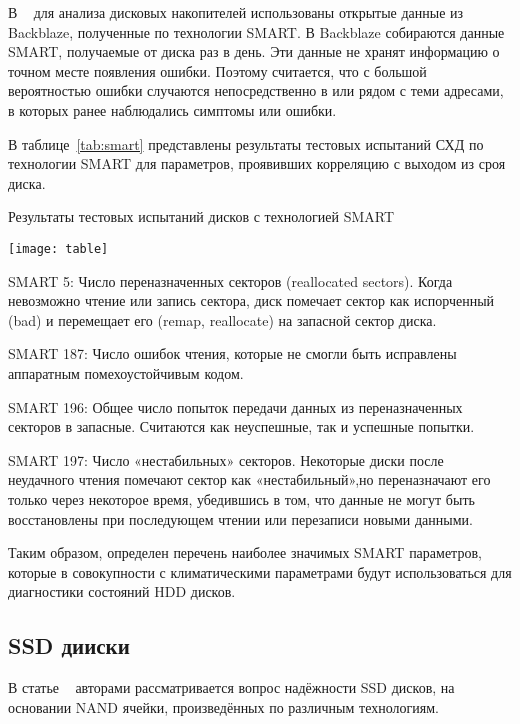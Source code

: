 В ~\cite{diskred} для анализа дисковых накопителей использованы открытые данные из Backblaze,  полученные  по  технологии SMART.  В Backblaze собираются  данные SMART,  получаемые  от диска  раз  в день.  Эти данные не хранят информацию о точном месте появления ошибки. Поэтому считается, что с большой вероятностью ошибки случаются непосредственно в или рядом с теми адресами, в которых ранее наблюдались симптомы или ошибки.

В таблице~\ref{tab:smart} представлены результаты тестовых испытаний СХД по технологии SMART для параметров, проявивших корреляцию с выходом из сроя диска.
\begin{table}
	\captionsetup{skip=5pt}
	\caption{Результаты тестовых испытаний дисков с технологией SMART}
	\centering
	\texttt{[image: table]}
	\label{tab:smart}
\end{table}
\begin{itemize*}
	\item{SMART 5:  Число  переназначенных  секторов  (reallocated sectors).  Когда 
невозможно чтение или запись сектора, диск помечает сектор как испорченный (bad) и перемещает его (remap, reallocate) на запасной сектор диска.}
	\item{SMART 187:  Число  ошибок  чтения,  которые  не  смогли  быть  исправлены 
аппаратным помехоустойчивым кодом.}
	\item{SMART 196:  Общее  число  попыток  передачи  данных  из  переназначенных 
секторов в запасные. Считаются как неуспешные, так и успешные попытки.}
	\item{SMART 197:  Число «нестабильных» секторов.  Некоторые  диски  после 
неудачного  чтения  помечают  сектор  как «нестабильный»,но  переназначают  его 
только  через  некоторое  время,  убедившись  в  том,  что  данные  не  могут  быть 
восстановлены при последующем чтении или перезаписи новыми данными.} 
\end{itemize*}

Таким образом, определен перечень наиболее значимых SMART параметров, которые в совокупности с климатическими параметрами будут использоваться для  диагностики состояний HDD дисков. 
\subsection{SSD дииски}

В статье ~\cite{reliabil} авторами рассматривается вопрос надёжности SSD дисков, на основании NAND ячейки, произведённых по различным технологиям.

